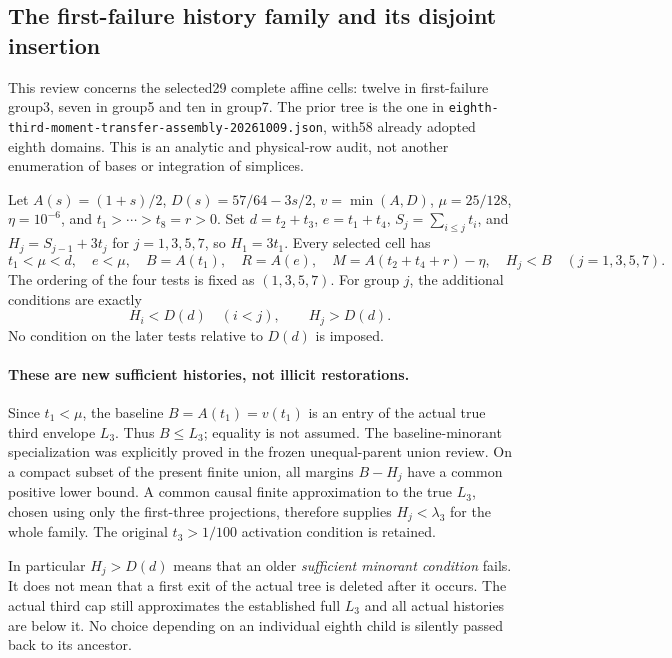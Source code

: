 \subsection{The first-failure history family and its disjoint insertion}
\label{sec:eighth-history-first-failure-analytic-review-20261009}

This review concerns the selected29 complete affine cells: twelve in
first-failure group3, seven in group5 and ten in group7. The prior
tree is the one in
\texttt{eighth-third-moment-transfer-assembly-20261009.json}, with58
already adopted eighth domains. This is an analytic and physical-row
audit, not another enumeration of bases or integration of simplices.

Let $A(s)=(1+s)/2$, $D(s)=57/64-3s/2$, $v=\min(A,D)$,
$\mu=25/128$, $\eta=10^{-6}$, and $t_1>\cdots>t_8=r>0$.
Set $d=t_2+t_3$, $e=t_1+t_4$, $S_j=\sum_{i\le j}t_i$,
and $H_j=S_{j-1}+3t_j$ for $j=1,3,5,7$, so $H_1=3t_1$.
Every selected cell has
\[
 t_1<\mu<d,\quad e<\mu,\quad B=A(t_1),\quad R=A(e),
 \quad M=A(t_2+t_4+r)-\eta,\quad H_j<B\quad(j=1,3,5,7).
\]
The ordering of the four tests is fixed as $(1,3,5,7)$.
For group $j$, the additional conditions are exactly
\[
 H_i<D(d)\quad(i<j),\qquad H_j>D(d).
 \tag{P}
\]
No condition on the later tests relative to $D(d)$ is imposed.

\paragraph{These are new sufficient histories, not illicit restorations.}
Since $t_1<\mu$, the baseline $B=A(t_1)=v(t_1)$ is an entry of
the actual true third envelope $L_3$. Thus $B\le L_3$; equality is
not assumed. The baseline-minorant specialization was explicitly
proved in the frozen unequal-parent union review. On a compact
subset of the present finite union, all margins $B-H_j$ have a
common positive lower bound. A common causal finite approximation
to the true $L_3$, chosen using only the first-three projections,
therefore supplies $H_j<\lambda_3$ for the whole family.
The original $t_3>1/100$ activation condition is retained.

In particular $H_j>D(d)$ means that an older \emph{sufficient
minorant condition} fails. It does not mean that a first exit of the
actual tree is deleted after it occurs. The actual third cap still
approximates the established full $L_3$ and all actual histories are
below it. No choice depending on an individual eighth child is
silently passed back to its ancestor.

